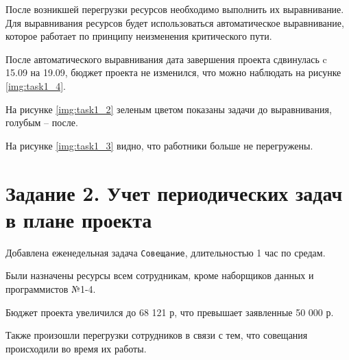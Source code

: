 \documentclass{bmstu}
\begin{document}
После возникшей перегрузки ресурсов необходимо выполнить их выравнивание.
Для выравнивания ресурсов будет использоваться автоматическое выравнивание, которое работает по принципу неизменения критического пути.


После автоматического выравнивания дата завершения проекта сдвинулась c 15.09 на 19.09, бюджет проекта не изменился, что можно наблюдать на рисунке \ref{img:task1_4}.

\clearpage


На рисунке \ref{img:task1_2} зеленым цветом показаны задачи до выравнивания, голубым -- после.


На рисунке \ref{img:task1_3} видно, что работники больше не перегружены.


\clearpage

\section*{Задание 2. Учет периодических задач в плане проекта}

Добавлена еженедельная задача \texttt{Совещание}, длительностью 1 час по средам.



\clearpage

Были назначены ресурсы всем сотрудникам, кроме наборщиков данных и программистов №1-4.



Бюджет проекта увеличился до 68 121 р, что превышает заявленные 50 000 р.


Также произошли перегрузки сотрудников в связи с тем, что совещания происходили во время их работы.

\clearpage

\end{document}
